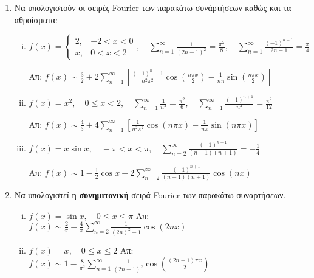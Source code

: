 \begin{enumerate}
  \item Να υπολογιστούν οι σειρές Fourier των παρακάτω συνάρτήσεων καθώς και 
    τα αθροίσματα:
    \begin{enumerate}[i)]
      \item $ f(x) = 
        \begin{cases}
          2, & -2<x<0 \\
          x, & 0<x<2
        \end{cases}, \quad \sum_{n=1}^{\infty} \frac{1}{(2n-1)^{2}} = \frac{\pi ^{2}}{8}
        , \quad \sum_{n=1}^{\infty} \frac{(-1)^{n+1}}{2n-1} = \frac{\pi}{4} $

        \hfill Απ: $ f(x) \sim \frac{3}{2} + 2 \sum_{n=1}^{\infty}
        \left[\frac{(-1)^{n}-1}{n^{2} \pi ^{2}} \cos{\left(\frac{n \pi x}{2}\right)}  - 
        \frac{1}{n \pi} \sin{\left(\frac{n \pi x}{2}\right)}\right] $  

      \item $ f(x) = x^{2}, \quad 0 \leq x < 2, \quad \sum_{n=1}^{\infty}
        \frac{1}{n^{2}} = \frac{\pi^{2}}{6}, \quad \sum_{n=1}^{\infty}
        \frac{(-1)^{n+1}}{n^{2}} = \frac{\pi ^{2}}{12} $

        \hfill Απ: $ f(x) \sim \frac{4}{3} + 4 \sum_{n=1}^{\infty} 
        \left[\frac{1}{n^{2} \pi ^{2}} \cos{(n \pi x )} - \frac{1}{n \pi}
        \sin{(n \pi x)}\right] $ 

      \item $ f(x) = x \sin{x}, \quad - \pi < x < \pi, \quad \sum_{n=2}^{\infty}
    \frac{(-1)^{n+1}}{(n-1)(n+1)} = - \frac{1}{4} $

    \hfill Απ: $ f(x) \sim 1 - \frac{1}{2} \cos{x} + 2\sum_{n=2}^{\infty}
    \frac{(-1)^{n+1}}{(n-1)(n+1)} \cos{(nx)} $ 
    \end{enumerate}

  \item Να υπολογιστεί η \textbf{συνημιτονική} σειρά Fourier των παρακάτω συναρτήσεων.
    \begin{enumerate}[i)]
      \item $ f(x) = \sin{x} , \quad 0 \leq x \leq \pi $ 
        \hfill Απ: $ f(x) \sim \frac{2}{\pi} - \frac{4}{\pi} \sum_{n=2}^{\infty}
        \frac{1}{(2n)^{2}-1} \cos{(2nx)} $ 
       \item $ f(x) = x, \quad 0 \leq x \leq 2 $ 
         \hfill Απ: $ f(x) \sim 1 - \frac{8}{\pi ^{2}} \sum_{n=1}^{\infty}
         \frac{1}{(2n-1)^{2}} \cos{\left(\frac{(2n-1) \pi x}{2}\right)} $ 
    \end{enumerate}


\end{enumerate}
